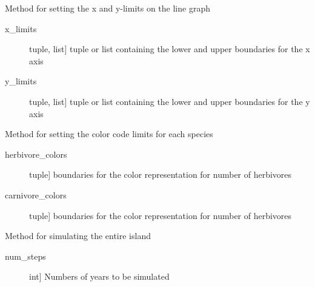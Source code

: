 \documentclass[a4paper,10pt,english]{sphinxmanual}
\begin{document}
\begin{fulllineitems}
\begin{fulllineitems}
\end{fulllineitems}


\begin{fulllineitems}
\label{\detokenize{simulation:biosim.simulation.BioSim.set_axis_limits}}
Method for setting the x and y-limits on the line graph
\begin{description}
\item[{x\_limits}] \leavevmode{[}tuple, list{]}
tuple or list containing the lower and upper boundaries for the
x axis

\item[{y\_limits}] \leavevmode{[}tuple, list{]}
tuple or list containing the lower and upper boundaries for the
y axis

\end{description}

\end{fulllineitems}


\begin{fulllineitems}
\label{\detokenize{simulation:biosim.simulation.BioSim.set_color_code_limits}}
Method for setting the color code limits for each species
\begin{description}
\item[{herbivore\_colors}] \leavevmode{[}tuple{]}
boundaries for the color representation for number of herbivores

\item[{carnivore\_colors}] \leavevmode{[}tuple{]}
boundaries for the color representation for number of herbivores

\end{description}

\end{fulllineitems}


\begin{fulllineitems}
\label{\detokenize{simulation:biosim.simulation.BioSim.simulate}}
Method for simulating the entire island
\begin{description}
\item[{num\_steps}] \leavevmode{[}int{]}
Numbers of years to be simulated


\end{description}
\end{fulllineitems}
\end{fulllineitems}
\end{document}
